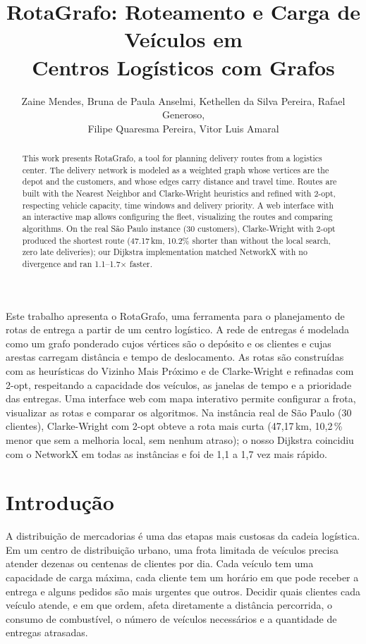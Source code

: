 \documentclass[12pt]{article}
\title{RotaGrafo: Roteamento e Carga de Veículos em\\Centros Logísticos com Grafos}
\author{Zaine Mendes\inst{1}, Bruna de Paula Anselmi\inst{1}, Kethellen da Silva Pereira\inst{1}, Rafael Generoso\inst{1},\\
        Filipe Quaresma Pereira\inst{1}, Vitor Luis Amaral\inst{1}}
\begin{document}
\maketitle

\begin{abstract}
This work presents RotaGrafo, a tool for planning delivery routes from a logistics
center. The delivery network is modeled as a weighted graph whose vertices are the
depot and the customers, and whose edges carry distance and travel time. Routes are
built with the Nearest Neighbor and Clarke-Wright heuristics and refined with 2-opt,
respecting vehicle capacity, time windows and delivery priority. A web interface with
an interactive map allows configuring the fleet, visualizing the routes and comparing
algorithms. On the real São Paulo instance (30 customers), Clarke-Wright with 2-opt
produced the shortest route (47.17\,km, 10.2\% shorter than without the local search,
zero late deliveries); our Dijkstra implementation matched NetworkX with no divergence
and ran 1.1--1.7$\times$ faster.
\end{abstract}

\begin{resumo}
Este trabalho apresenta o RotaGrafo, uma ferramenta para o planejamento de rotas de
entrega a partir de um centro logístico. A rede de entregas é modelada como um grafo
ponderado cujos vértices são o depósito e os clientes e cujas arestas carregam
distância e tempo de deslocamento. As rotas são construídas com as heurísticas do
Vizinho Mais Próximo e de Clarke-Wright e refinadas com 2-opt, respeitando a
capacidade dos veículos, as janelas de tempo e a prioridade das entregas. Uma
interface web com mapa interativo permite configurar a frota, visualizar as rotas e
comparar os algoritmos. Na instância real de São Paulo (30 clientes), Clarke-Wright com
2-opt obteve a rota mais curta (47,17\,km, 10,2\,\% menor que sem a melhoria local, sem
nenhum atraso); o nosso Dijkstra coincidiu com o NetworkX em todas as instâncias e foi
de 1,1 a 1,7 vez mais rápido.
\end{resumo}

\section{Introdução}

A distribuição de mercadorias é uma das etapas mais custosas da cadeia logística.
Em um centro de distribuição urbano, uma frota limitada de veículos precisa atender
dezenas ou centenas de clientes por dia. Cada veículo tem uma capacidade de carga
máxima, cada cliente tem um horário em que pode receber a entrega e alguns pedidos
são mais urgentes que outros. Decidir quais clientes cada veículo atende, e em que
ordem, afeta diretamente a distância percorrida, o consumo de combustível, o número
de veículos necessários e a quantidade de entregas atrasadas.
\end{document}

